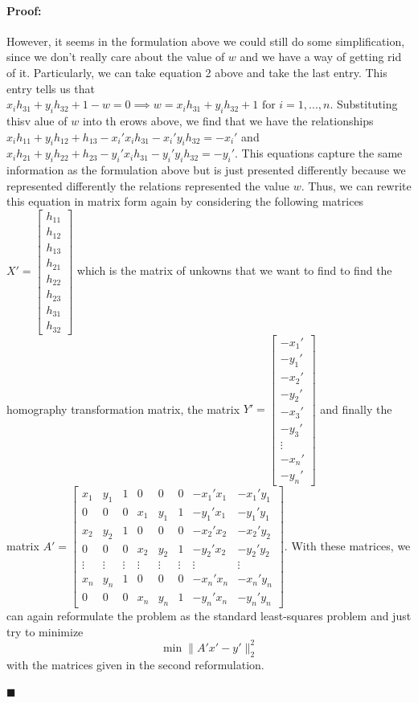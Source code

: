 \documentclass[12pt]{article}
\newenvironment{proof}{\paragraph{Proof: }}{\hfill$\blacksquare$}
\begin{document}
\begin{proof}
\begin{enumerate}
However, it seems in the formulation above we could still do some simplification, since we don't really care about the value of $w$ and we have a way of getting rid of it. Particularly, we can take equation 2 above and take the last entry. This entry tells us that $x_i h_{31} + y_ih_{32} + 1 -w = 0 \implies w =x_i h_{31} + y_ih_{32} + 1 \text{ for } i = 1,...,n$. Substituting thisv alue of $w$ into th erows above, we find that we have the relationships $x_i h_{11} + y_i h_{12} + h_{13} - x_i'x_i h_{31} - x_i'y_ih_{32} = -x_i'$ and $x_ih_{21} + y_ih_{22} + h_{23} -y_i'x_ih_{31} -y_i'y_ih_{32} = -y_i'$. This equations capture the same information as the formulation above but is just presented differently because we represented differently the relations represented the value $w$. Thus, we can rewrite this equation in matrix form again by considering the following matrices $X' = \left[\begin{matrix} h_{11} \\ h_{12} \\ h_{13} \\ h_{21} \\ h_{22} \\ h_{23} \\ h_{31} \\ h_{32} \end{matrix}\right]$ which is the matrix of unkowns that we want to find to find the homography transformation matrix, the matrix $Y' = \left[\begin{matrix} -x_1' \\ -y_1'\\-x_2' \\ -y_2' \\ -x_3' \\ -y_3'\\ \vdots\\-x_n' \\ -y_n'\end{matrix}\right]$ and finally the matrix $A' = \left[\begin{matrix} x_1 & y_1 &1 & 0& 0 & 0 & -x_1'x_1 & -x_1'y_1 \\ 0 & 0& 0 & x_1 & y_1 & 1  & -y_1'x_1 & -y_1'y_1 \\ x_2 & y_2 & 1 & 0& 0 & 0 & -x_2'x_2 & -x_2'y_2 \\0 & 0& 0 & x_2 & y_2 & 1 & -y_2'x_2 & -y_2'y_2\\ \vdots & \vdots & \vdots & \vdots & \vdots & \vdots & \vdots & \vdots \\ x_n & y_n &1 & 0& 0 & 0 & -x_n'x_n & -x_n'y_n \\ 0 & 0& 0 & x_n & y_n & 1 & -y_n'x_n & -y_n'y_n\end{matrix}\right]$. With these matrices, we can again reformulate the problem as the standard least-squares problem and just try to minimize $$\min\|A'x' - y'\|_2^2$$ with the matrices given in the second reformulation.


\end{enumerate}
\end{proof}
\end{document}
